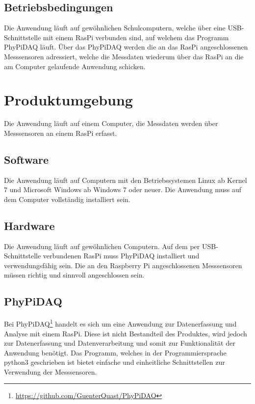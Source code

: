 \documentclass[parskip=full]{scrartcl}
\begin{document}
\subsection{Betriebsbedingungen}

Die Anwendung läuft auf gewöhnlichen Schulcomputern, welche über eine USB-Schnittstelle mit einem RasPi verbunden sind, auf welchem das Programm \gls{PhyPiDAQ} läuft. Über das \gls{PhyPiDAQ} werden die an das RasPi angeschlossenen Messsensoren adressiert, welche die Messdaten wiederum über das RasPi an die am Computer gelaufende Anwendung schicken. 


\section{Produktumgebung}

Die Anwendung läuft auf einem Computer, die Messdaten werden über Messsensoren an einem \gls{RasPi} erfasst.

\subsection{Software}

Die Anwendung läuft auf Computern mit den Betriebssystemen Linux ab Kernel 7 und Microsoft Windows ab Windows 7 oder neuer. Die Anwendung muss auf dem Computer vollständig installiert sein. 

\subsection{Hardware}

Die Anwendung läuft auf gewöhnlichen Computern.
Auf dem per USB-Schnittstelle verbundenen \gls{RasPi} muss PhyPiDAQ installiert und verwendungsfähig sein.
Die an den Raspberry Pi angeschlossenen Messsensoren müssen richtig und sinnvoll angeschlossen sein.

\subsection{PhyPiDAQ}

Bei PhyPiDAQ\footnote{\url{https://github.com/GuenterQuast/PhyPiDAQ}} handelt es sich um eine Anwendung zur Datenerfassung und Analyse mit einem \gls{RasPi}. Diese ist nicht Bestandteil des Produktes, wird jedoch zur Datenerfassung und Datenverarbeitung und somit zur Funktionalität der Anwendung  benötigt. Das Programm, welches in der Programmiersprache python3 geschrieben ist bietet einfache und einheitliche Schnittstellen zur Verwendung der Messsensoren.
\end{document}
